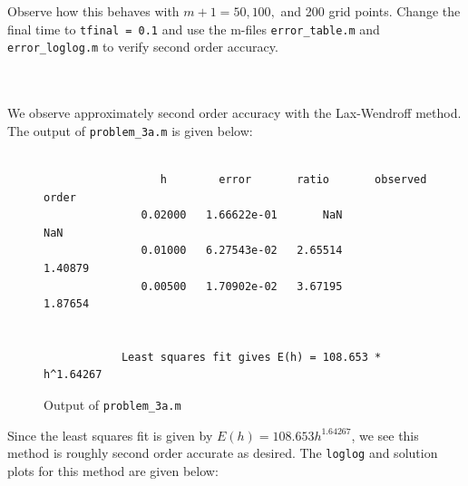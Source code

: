 Observe how this behaves with $m + 1 = 50, 100,$ and 200 grid points. Change the final time to 
\texttt{tfinal = 0.1} and use the m-files \texttt{error\_table.m} and \texttt{error\_loglog.m} to verify second order 
accuracy.

\begin{solution}\ \\\\
    We observe approximately second order accuracy with the Lax-Wendroff method. The output of \texttt{problem\_3a.m} is
    given below: \ \\\\

    \begin{figure}[h]
        \begin{verbatim}
                  h        error       ratio       observed order
               0.02000   1.66622e-01       NaN             NaN
               0.01000   6.27543e-02   2.65514         1.40879
               0.00500   1.70902e-02   3.67195         1.87654
             
             
            Least squares fit gives E(h) = 108.653 * h^1.64267
        \end{verbatim}
        \caption{Output of \texttt{problem\_3a.m}}
    \end{figure}

    Since the least squares fit is given by $E(h) = 108.653 h^{1.64267}$, we see this method is roughly second order 
    accurate as desired. The \texttt{loglog} and solution plots for this method are given below:


\end{solution}
